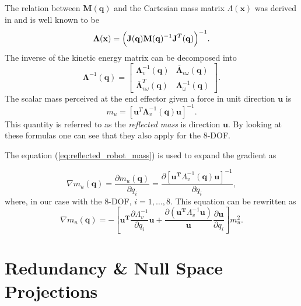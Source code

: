 The relation between $\mathbf{M}(\mathbf{q})$ and the Cartesian mass matrix $\Lambda(\mathbf{x})$ was derived in \cite{khatib1995} and is well known to be 
\begin{equation}
\mathbf{\Lambda}(\mathbf{x}) = \Bigl ( \mathbf{J}(\mathbf{q}) \mathbf{M}(\mathbf{q})^{-1} \mathbf{J}^{T}(\mathbf{q}) \Bigr )^{-1}. \label{eq:lambda}
\end{equation}
The inverse of the kinetic energy matrix can be decomposed into
\begin{equation}
\mathbf{\Lambda}^{-1}(\mathbf{q}) = 
\begin{bmatrix}
\mathbf{\Lambda}_{v}^{-1}(\mathbf{q}) & \overline{\mathbf{\Lambda}}_{v\omega}(\mathbf{q}) \\
\overline{\mathbf{\Lambda}}_{v\omega}^T(\mathbf{q}) & \mathbf{\Lambda}_{\omega}^{-1}(\mathbf{q})
\end{bmatrix}.
\end{equation}
The scalar mass perceived at the end effector given a force in unit direction $\mathbf{u}$ is
\begin{equation}
m_{u} = [\mathbf{u}^T \mathbf{\Lambda}_{v}^{-1}(\mathbf{q})   \mathbf{u}]^{-1}   .  \label{eq:reflected_robot_mass} 
\end{equation}
This quantity is referred to as the \emph{reflected mass} is direction $\mathbf{u}$. By looking at these formulas one can see that they also apply for the 8-DOF.

The equation (\ref{eq:reflected_robot_mass}) is used to expand the gradient as

\begin{equation}
\nabla m_u(\mathbf{q}) = 
\frac{\partial {m_u(\mathbf{q})}}{\partial {q_i}} = \frac{\partial {[\mathbf{u^T} \Lambda_{v}^{-1}(\mathbf{q}) \mathbf{u}]^{-1}}}{\partial {q_i}}, \label{eq:grad_refl_mass_1}
\end{equation}
where, in our case with the 8-DOF,  $i = 1, \dots, 8$. This equation can be rewritten as
\begin{equation}
\nabla m_u(\mathbf{q}) = - \left [ \mathbf{u^T} \frac{\partial {\Lambda_{v}^{-1}}}{\partial {q_i}} \mathbf{u} +
\frac{\partial {(\mathbf{u^T} \Lambda_{v}^{-1} \mathbf{u})}}{\mathbf{u}} \frac{\partial {\mathbf{u}}}{\partial {q_i}} \right ] m_u^2	. \label{eq:grad_refl_mass_2}
\end{equation}

\section{Redundancy \& Null Space Projections }
\label{subsec:nsprojection}

